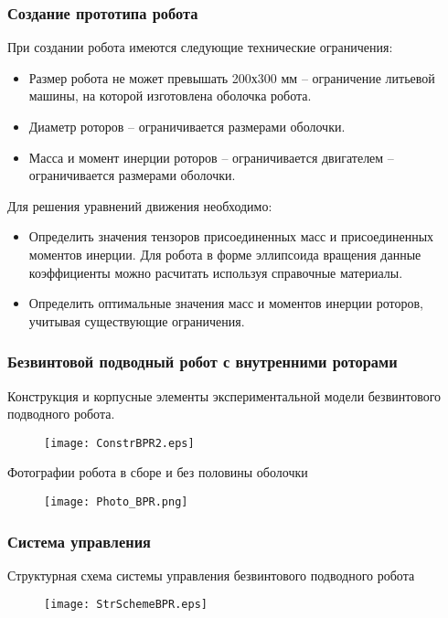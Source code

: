 \begin{frame}
\frametitle{Создание прототипа робота}

При создании робота имеются следующие технические ограничения:
\begin{itemize}
	\item Размер робота не может превышать 200х300 мм -- ограничение литьевой машины, на которой изготовлена оболочка робота. 
	\item Диаметр роторов -- ограничивается размерами оболочки.
	\item Масса и момент инерции роторов -- ограничивается двигателем -- ограничивается размерами оболочки.
\end{itemize}

Для решения уравнений движения необходимо:
\begin{itemize}
	\item Определить значения тензоров присоединенных масс и присоединенных моментов инерции. Для робота в форме эллипсоида вращения данные коэффициенты можно расчитать используя справочные материалы.
	\item Определить оптимальные значения масс и моментов инерции роторов, учитывая существующие ограничения.	
\end{itemize}

\end{frame}






\begin{frame}
\frametitle{Безвинтовой подводный робот с внутренними роторами}

Конструкция и корпусные элементы экспериментальной модели безвинтового подводного робота.
\begin{figure}[h]
	\centering
	\texttt{[image: ConstrBPR2.eps]}%
\end{figure}

Фотографии робота в сборе и без половины оболочки
\begin{figure}[h]
	\centering
	\texttt{[image: Photo\_BPR.png]}%
\end{figure}

\end{frame}


\begin{frame}
\frametitle{Система управления}
Структурная схема системы управления безвинтового подводного робота

\begin{figure}[h!]
	\begin{center}
		\texttt{[image: StrSchemeBPR.eps]}
	\end{center}
\end{figure}

\end{frame}



